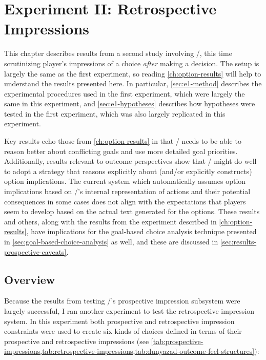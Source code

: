 \chapter{Experiment II: Retrospective Impressions}

\label{ch:outcome-results}

This chapter describes results from a second study involving \dunyazad/, this time scrutinizing player's impressions of a choice \emph{after} making a decision.
%
The setup is largely the same as the first experiment, so reading \cref{ch:option-results} will help to understand the results presented here.
%
In particular, \cref{sec:e1-method} describes the experimental procedures used in the first experiment, which were largely the same in this experiment, and \cref{sec:e1-hypotheses} describes how hypotheses were tested in the first experiment, which was also largely replicated in this experiment.


Key results echo those from \cref{ch:option-results} in that \dunyazad/ needs to be able to reason better about conflicting goals and use more detailed goal priorities.
%
Additionally, results relevant to outcome perspectives show that \dunyazad/ might do well to adopt a strategy that reasons explicitly about (and/or explicitly constructs) option implications.
%
The current system which automatically assumes option implications based on \dunyazad/'s internal representation of actions and their potential consequences in some cases does not align with the expectations that players seem to develop based on the actual text generated for the options.
%
These results and others, along with the results from the experiment described in \cref{ch:option-results}, have implications for the goal-based choice analysis technique presented in \cref{sec:goal-based-choice-analysis} as well, and these are discussed in \cref{sec:results-prospective-caveats}.


\section{Overview}


Because the results from testing \dunyazad/'s prospective impression subsystem were largely successful, I ran another experiment to test the retrospective impression system.
%
In this experiment both prospective and retrospective impression constraints were used to create six kinds of choices defined in terms of their prospective and retrospective impressions (see \cref{tab:prospective-impressions,tab:retrospective-impressions,tab:dunyazad-outcome-feel-structures}):

